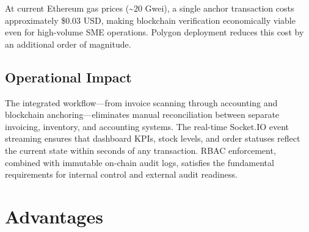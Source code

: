 \documentclass[conference]{IEEEtran}
\begin{document}
At current Ethereum gas prices (\textasciitilde 20 Gwei), a single anchor transaction costs approximately \$0.03 USD, making blockchain verification economically viable even for high-volume SME operations. Polygon deployment reduces this cost by an additional order of magnitude.

\subsection{Operational Impact}
The integrated workflow—from invoice scanning through accounting and blockchain anchoring—eliminates manual reconciliation between separate invoicing, inventory, and accounting systems. The real-time Socket.IO event streaming ensures that dashboard KPIs, stock levels, and order statuses reflect the current state within seconds of any transaction. RBAC enforcement, combined with immutable on-chain audit logs, satisfies the fundamental requirements for internal control and external audit readiness.

\section{Advantages}
\end{document}

